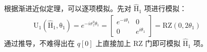 \documentclass[a4paper,11pt,english]{sphinxmanual}
\begin{document}
\sphinxAtStartPar
  根据渐进近似定理，可以逐项模拟。先对 \(\mathrm{\hat{H}}_1\) 项进行模拟：
\begin{equation*}
\begin{split}\mathrm{U}_{1}\left(\mathrm{\hat{H}}_{1}, \mathrm{\theta}_{1}\right)=e^{-i \sigma_{z}^{0} \theta_{1}}=\left[\begin{array}{cc} e^{-i \theta_{1}} & 0 \\ 0 & e^{i \theta_{1}} \end{array}\right]=\mathrm{RZ}\left(0,2 \theta_{1}\right)\end{split}
\end{equation*}
\sphinxAtStartPar
  通过推导，不难得出在 \(q[0]\) 上直接加上 \(\mathrm{RZ}\) 门即可模拟 \(\mathrm{\hat{H}}_1\) 项。

\end{document}
